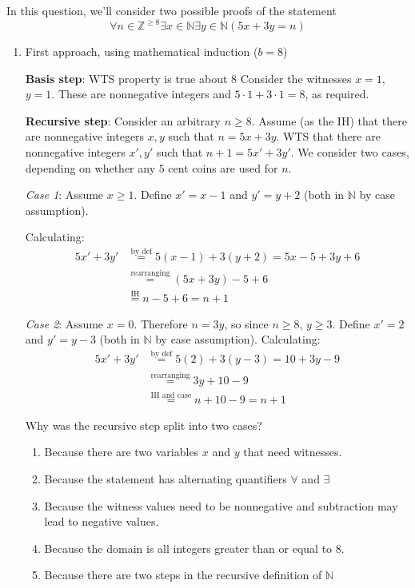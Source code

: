 
In this question, we'll consider two possible 
proofs of the statement
\[
    \forall n  \in  \mathbb{Z}^{\geq 8}  \exists x \in \mathbb{N}  \exists y \in \mathbb{N}  (  5x+3y =  n)
\]

\begin{enumerate}
\item First approach, using mathematical induction ($b=8$)

{\bf Basis step}:  WTS property is true about  $8$
Consider the witnesses $x = 1$, $y=1$. These 
are nonnegative integers and $5 \cdot 1 + 3 \cdot 1 = 8$, as
required.

{\bf Recursive step}: Consider an  arbitrary  $n \geq 8$.
Assume (as the  IH) that  there are nonnegative integers
$x, y$ such that $n =  5x +  3y$.  WTS
that there are nonnegative integers $x', y'$ such
that  $n+1 = 5x' +  3y'$.  We consider two cases, 
depending on  whether  any  $5$ cent coins
are used for $n$.

{\it Case 1}:  Assume $x \geq  1$.
Define $x' = x-1$ and $y'=y+2$ (both in  $\mathbb{N}$ by case assumption).


Calculating:
\begin{align*}
5x' +  3y' &\overset{\text{by def}}{=}  5(x-1) +  3(y+2)  = 5x -  5 +3y +   6  \\
&\overset{\text{rearranging}} = (5x+3y) -5  + 6\\
& \overset{\text{IH}}{=} n-5+6 =  n+1
\end{align*}


{\it  Case 2}: Assume $x = 0$.  Therefore  $n  = 3y$,  so 
since  $n \geq 8$, $y \geq 3$. Define $x' = 2$ and $y'=y-3$
(both in $\mathbb{N}$ by case assumption).
Calculating:
\begin{align*}
5x' +  3y' &\overset{\text{by def}}{=}  5(2) +  3(y-3)  = 10  +3y -9  \\
&\overset{\text{rearranging}} = 3y +10 -9 \\
&\overset{\text{IH and case}}{=} n+10-9 =  n+1
\end{align*}


Why was the recursive step split into two cases?
\begin{enumerate}
    \item Because there are two variables $x$ and $y$ that need witnesses.
    \item Because the statement has alternating quantifiers $\forall$ and $\exists$
    \item Because the witness values need to be nonnegative and subtraction may lead to negative values.
    \item Because the domain is all integers greater than or equal to $8$.
    \item Because there are two steps in the recursive definition of $\mathbb{N}$
\end{enumerate}


\end{enumerate}
